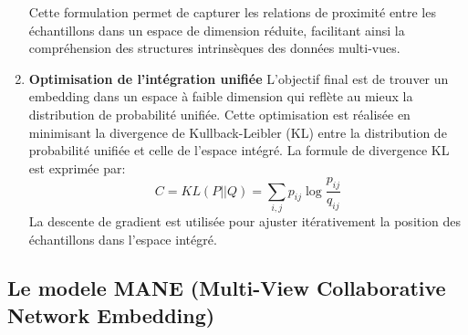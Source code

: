 \begin{enumerate}
                Cette formulation permet de capturer les relations de proximité entre les échantillons dans un espace de dimension réduite, facilitant ainsi la compréhension des structures intrinsèques des données multi-vues.
    
            
             \item\textbf{Optimisation de l'intégration unifiée}
                L'objectif final est de trouver un embedding dans un espace à faible dimension qui reflète au mieux la distribution de probabilité unifiée. Cette optimisation est réalisée en minimisant la divergence de Kullback-Leibler (KL) entre la distribution de probabilité unifiée et celle de l'espace intégré. La formule de divergence KL est exprimée par:
                \begin{equation}
                     C = KL(P || Q) = \sum_{i, j} p_{ij} \log \frac{p_{ij}}{q_{ij}}
                \end{equation}
                La descente de gradient est utilisée pour ajuster itérativement la position des échantillons dans l'espace intégré.
        \end{enumerate}
        \subsection{Le modele MANE (Multi-View Collaborative Network Embedding) }
        
